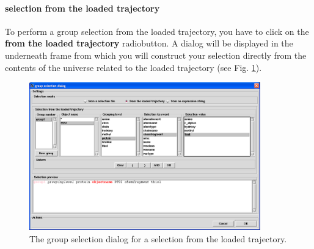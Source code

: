 \documentclass[a4paper,11pt]{report}
\begin{document}
\paragraph{selection from the loaded trajectory\\}
To perform a group selection from the loaded trajectory, you have to click on the \textbf{from the loaded trajectory} 
radiobutton. A dialog will be displayed in the underneath frame from which you will construct your selection directly from 
the contents of the universe related to the loaded trajectory (see Fig. \ref{fig:group_selection_from_the_loaded_trajectory}).
\begin{figure}[h!]
\begin{center}
\includegraphics[width=10cm]{Figures/group_selection_from_the_loaded_trajectory.eps}
\end{center}
\caption[The group selection dialog for a selection from the loaded trajectory]{The group selection dialog for a selection from the loaded trajectory.}
\label{fig:group_selection_from_the_loaded_trajectory}
\end{figure}   
\end{document}
